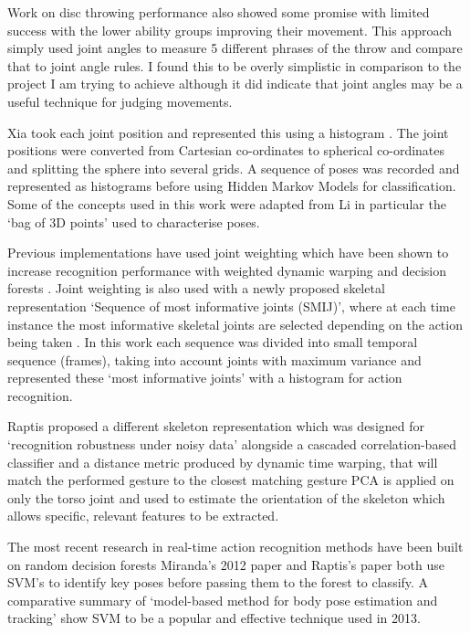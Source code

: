 Work on disc throwing performance \cite{Yamaoka2013} also showed some promise with limited success with the lower ability groups improving their movement. This approach simply used joint angles to measure 5 different phrases of the throw and compare that to joint angle rules. I found this to be overly simplistic in comparison to the project I am trying to achieve although it did indicate that joint angles may be a useful technique for judging movements.

Xia took each joint position and represented this using a histogram \cite{hmm1}.  The joint positions were converted from Cartesian co-ordinates to spherical co-ordinates and splitting the sphere into several grids. A sequence of poses was recorded and represented as histograms before using Hidden Markov Models for classification.  Some of the concepts used in this work were adapted from Li \cite{3dbag} in particular the `bag of 3D points' used to characterise poses.

Previous implementations have used joint weighting which have been shown to increase recognition performance with weighted dynamic warping \cite{dtw1} and decision forests \cite{randforest}. Joint weighting is also used with a newly proposed skeletal representation `Sequence of most informative joints (SMIJ)', where at each time instance the most informative skeletal joints are selected depending on the action being taken \cite{SMIJ}. In this work each sequence was divided into small temporal sequence (frames), taking into account joints with maximum variance and represented these `most informative joints' with a histogram for action recognition.

Raptis proposed a different skeleton representation which was designed for `recognition robustness under noisy data' \cite{Raptis2011a} alongside a cascaded correlation-based classifier and a distance metric produced by dynamic time warping, that will match the performed gesture to the closest matching gesture \cite{Kaewplee.}
PCA is applied on only the torso joint and used to estimate the orientation of the skeleton which allows specific, relevant features to be extracted.


The most recent research in real-time action recognition methods have been built on random decision forests \cite{randforest} \cite{Miranda2014.} Miranda's 2012 paper \cite{Miranda2012}  and Raptis's paper \cite{Raptis2011a} both use SVM's to identify key poses before passing them to the forest to classify. A comparative summary of `model-based method for body pose estimation and tracking' \cite{Manjuatha2014} show SVM to be a popular and effective technique used in 2013.


